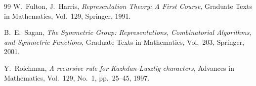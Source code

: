 \documentclass{sjtureport}
\begin{document}
\printindex


\medskip


\medskip
\begin{thebibliography}{99}
W.~Fulton, J.~Harris,
\emph{Representation Theory: A First Course},
Graduate Texts in Mathematics, Vol.~129, Springer, 1991.

B.~E.~Sagan,
\emph{The Symmetric Group: Representations, Combinatorial Algorithms, and Symmetric Functions},
Graduate Texts in Mathematics, Vol.~203, Springer, 2001.

Y.~Roichman,
\emph{A recursive rule for Kazhdan-Lusztig characters},
Advances in Mathematics, Vol.~129, No.~1, pp.~25--45, 1997.
\end{thebibliography}
\end{document}
